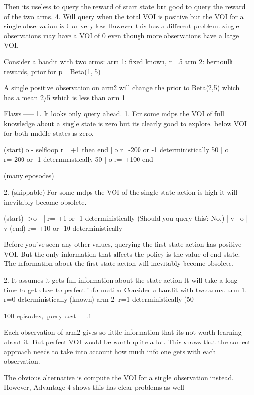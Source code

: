 {    Then its useless to query the reward of start state but good to query the reward of the two arms.
4. Will query when the total VOI is positive but the VOI for a single observation is 0 or very low
      However this has a different problem: single observations may have a VOI of 0 even though more observations have a large VOI.

      Consider a bandit with two arms:
        arm 1: fixed known, r=.5 
        arm 2: bernoulli rewards, prior for p ~ Beta(1, 5)

      A single positive observation on arm2 will change the prior to Beta(2,5) which has a mean 2/5 which is less than arm 1


Flaws
-----
1. It looks only query ahead. 
  1. For some mdps the VOI of full knowledge about a single state is zero but its clearly good to explore.
  below VOI for both middle states is zero.  

  (start)
    o - selfloop r= +1 then end 
    |
    o r=-200 or -1 deterministically 50%
    |
    o r=-200 or -1 deterministically 50%
    | 
    o r= +100 end

    (many eposodes)

  2. (skippable) For some mdps the VOI of the single state-action is high it will inevitably become obsolete.

  (start)
  ->o
  | | r= +1 or -1 deterministically (Should you query this? No.)
  | v
  --o
    |
    v
   (end) r= +10 or -10 deterministically 

   Before you've seen any other values, querying the first state action has positive VOI. But the only information that affects the policy is the value of end state. The information about the first state action will inevitably become obsolete.
    
2. It assumes it gets full information about the state action
    It will take a long time to get close to perfect information
      Consider a bandit with two arms: 
        arm 1: r=0 deterministically (known) 
        arm 2: r=1 deterministically (50%
        
      100 episodes, 
      query cost = .1

      Each observation of arm2 gives so little information that its not worth learning about it. But perfect VOI would be worth quite a lot.
      This shows that the correct approach needs to take into account how much info one gets with each observation.

      The obvious alternative is compute the VOI for a single observation instead. However, Advantage 4 shows this has clear problems as well.
      
}
